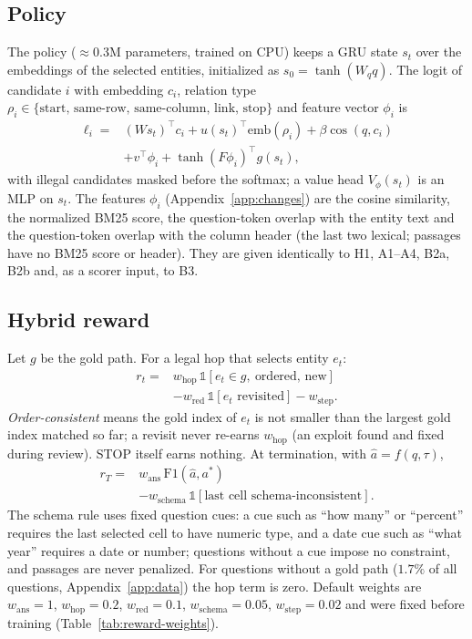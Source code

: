 \subsection{Policy}
The policy ($\approx$0.3M parameters, trained on CPU) keeps a GRU state $s_t$ over the embeddings of the selected entities, initialized as $s_0=\tanh(W_q q)$.
The logit of candidate $i$ with embedding $c_i$, relation type $\rho_i\in\{\text{start, same-row, same-column, link, stop}\}$ and feature vector $\phi_i$ is
\begin{equation}
\begin{split}\ell_i={}&(Ws_t)^\top c_i+u(s_t)^\top \mathrm{emb}(\rho_i)+\beta\cos(q,c_i)\\&+v^\top\phi_i+\tanh(F\phi_i)^\top g(s_t),\end{split}
\end{equation}
with illegal candidates masked before the softmax; a value head $V_\phi(s_t)$ is an MLP on $s_t$.
The features $\phi_i$ (Appendix~\ref{app:changes}) are the cosine similarity, the normalized BM25 score, the question-token overlap with the entity text and the question-token overlap with the column header (the last two lexical; passages have no BM25 score or header).
They are given identically to H1, A1--A4, B2a, B2b and, as a scorer input, to B3.

\subsection{Hybrid reward}
Let $g$ be the gold path.
For a legal hop that selects entity $e_t$:
\begin{equation}
\begin{split}r_t={}&w_{\text{hop}}\,\mathbb{1}[e_t\in g,\ \text{ordered, new}]\\&-w_{\text{red}}\,\mathbb{1}[e_t\text{ revisited}]-w_{\text{step}}.\end{split}
\end{equation}
\emph{Order-consistent} means the gold index of $e_t$ is not smaller than the largest gold index matched so far; a revisit never re-earns $w_{\text{hop}}$ (an exploit found and fixed during review).
STOP itself earns nothing.
At termination, with $\hat a=f(q,\tau)$,
\begin{equation}
\begin{split}r_T={}&w_{\text{ans}}\,\mathrm{F1}(\hat a,a^\ast)\\&-w_{\text{schema}}\,\mathbb{1}[\text{last cell schema-inconsistent}].\end{split}
\end{equation}
The schema rule uses fixed question cues: a cue such as ``how many'' or ``percent'' requires the last selected cell to have numeric type, and a date cue such as ``what year'' requires a date or number; questions without a cue impose no constraint, and passages are never penalized.
For questions without a gold path ($1.7\%$ of all questions, Appendix~\ref{app:data}) the hop term is zero.
Default weights are $w_{\text{ans}}=1$, $w_{\text{hop}}=0.2$, $w_{\text{red}}=0.1$, $w_{\text{schema}}=0.05$, $w_{\text{step}}=0.02$ and were fixed before training (Table~\ref{tab:reward-weights}).

